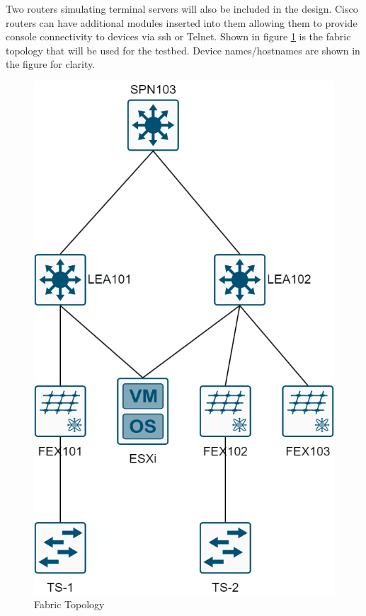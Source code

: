 Two routers simulating
terminal servers will also be included in the design. Cisco routers can have
additional modules inserted into them allowing them to provide console
connectivity to devices via \gls{ssh} or Telnet.
Shown in figure
\ref{fig:fabric-topology} is the fabric topology that will be used for the
testbed. Device names/hostnames are shown in the figure for clarity.

\begin{figure}[H]
    \centering

    \includegraphics[scale=0.3]{images/aci-topology.png}
    \caption{Fabric
        Topology}
    \label{fig:fabric-topology}
\end{figure}

